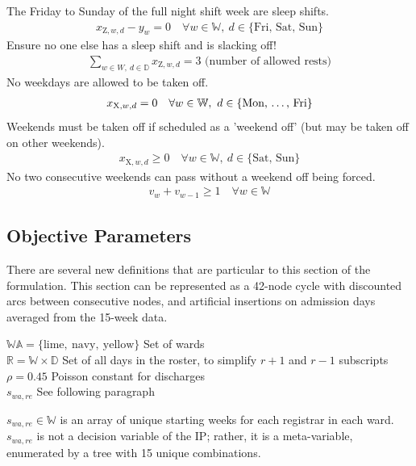 \documentclass[a4paper]{article}
\begin{document}
The Friday to Sunday of the full night shift week are sleep shifts.
\begin{align}
  x_{\text{Z}, w, d} - y_w = 0 \quad\forall w\in \mathbb{W},\ d\in \{\text{Fri, Sat, Sun}\}
\end{align}
Ensure no one else has a sleep shift and is slacking off!
\begin{align}
  \sum_{w\in W,\ d\in \mathbb{D}} x_{\text{Z}, w, d} = 3 \text{ (number of allowed rests)}
\end{align}
No weekdays are allowed to be taken off.
\begin{align}
  x_{\text{X}, w, d} = 0 \quad\forall w\in \mathbb{W},\ d\in \{\text{Mon, \dots, Fri}\}
\end{align}
Weekends must be taken off if scheduled as a 'weekend off' (but may be taken off on other weekends).
\begin{align}
  x_{\text{X}, w, d} \ge 0 \quad\forall w\in \mathbb{W},\ d\in \{\text{Sat, Sun}\}
\end{align}
No two consecutive weekends can pass without a weekend off being forced.
\begin{align}
  v_w + v_{w-1} \ge 1 \quad\forall w\in \mathbb{W}
\end{align}

\subsection{Objective Parameters}

There are several new definitions that are particular to this section of the formulation. This section can be represented as a 42-node cycle with discounted arcs between consecutive nodes, and artificial insertions on admission days averaged from the 15-week data.

\begin{multicols}{2}
\begin{flushright}
$\mathbb{WA} = \{\text{lime},\ \text{navy},\ \text{yellow}\}$ \dotfill Set of wards\\
$\mathbb{R} = \mathbb{W}\times \mathbb{D}$ \dotfill Set of all days in the roster, to simplify $r+1$ and $r-1$ subscripts\\
$\rho = 0.45$ \dotfill Poisson constant for discharges\\
$s_{wa,re}$ \dotfill See following paragraph
\end{flushright}

$s_{wa, re} \in \mathbb{W}$ is an array of unique starting weeks for each registrar in each ward. $s_{wa, re}$ is not a decision variable of the IP; rather, it is a meta-variable, enumerated by a tree with 15 unique combinations.
\end{multicols}
\end{document}
